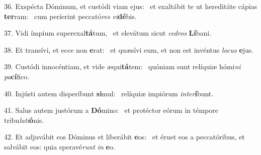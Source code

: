 36. Exspécta Dóminum, et custódi viam ejus: \dag\  et exaltábit te ut hereditáte cápias \textbf{ter}ram: \ast\  cum períerint peccató\textit{res} \textit{vi}\textbf{dé}bis.\

37. Vidi ímpium superexal\textbf{tá}tum, \ast\  et elevátum sicut \textit{ce}\textit{dros} \textbf{Lí}bani.\

38. Et transívi, et ecce non \textbf{e}rat: \ast\  et quæsívi eum, et non est invéntus \textit{lo}\textit{cus} \textbf{e}jus.\

39. Custódi innocéntiam, et vide æqui\textbf{tá}tem: \ast\  quóniam sunt relíquiæ hómi\textit{ni} \textit{pa}\textbf{cí}fico.\

40. Injústi autem disperíbunt \textbf{si}mul: \ast\  relíquiæ impiórum \textit{in}\textit{ter}\textbf{í}bunt.\

41. Salus autem justórum a \textbf{Dó}mino: \ast\  et protéctor eórum in témpore tribu\textit{la}\textit{ti}\textbf{ó}nis.\

42. Et adjuvábit eos Dóminus et liberábit \textbf{e}os: \ast\  et éruet eos a peccatóribus, et salvábit eos: quia speravé\textit{runt} \textit{in} \textbf{e}o.\

